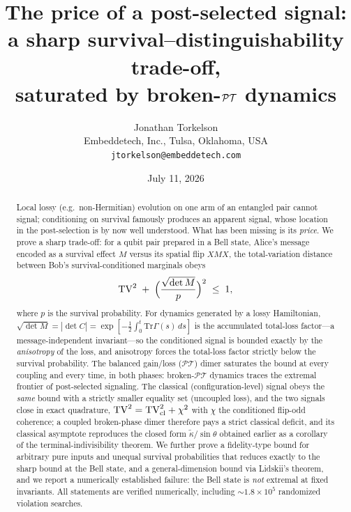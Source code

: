 \documentclass[11pt]{article}
\title{The price of a post-selected signal:\\
a sharp survival--distinguishability trade-off,\\
saturated by broken-$\PT$ dynamics}
\author{Jonathan Torkelson\\[2pt]
\small Embeddetech, Inc., Tulsa, Oklahoma, USA\\
\small\texttt{jtorkelson@embeddetech.com}}
\date{July 11, 2026}
\theoremstyle{remark}
\newcommand{\PT}{\mathcal{PT}}
\newcommand{\TV}{\mathrm{TV}}
\newcommand{\Tr}{\mathrm{Tr}}
\begin{document}
\maketitle

\begin{abstract}
Local lossy (e.g.\ non-Hermitian) evolution on one arm of an entangled
pair cannot signal; conditioning on survival famously produces an
apparent signal, whose location in the post-selection is by now well
understood. What has been missing is its \emph{price}. We prove a
sharp trade-off: for a qubit pair prepared in a Bell state, Alice's
message encoded as a survival effect $M$ versus its spatial flip
$XMX$, the total-variation distance between Bob's survival-conditioned
marginals obeys
\[
\TV^{2}\;+\;\Bigl(\frac{\sqrt{\det M}}{p}\Bigr)^{2}\;\le\;1 ,
\]
where $p$ is the survival probability. For dynamics generated by a
lossy Hamiltonian, $\sqrt{\det M}=|\det C|=\exp[-\tfrac12\!\int_0^t\!\Tr\Gamma(s)\,
ds]$ is the accumulated total-loss factor---a message-independent
invariant---so the conditioned signal is bounded exactly by the
\emph{anisotropy} of the loss, and anisotropy forces the total-loss
factor strictly below the survival probability. The
balanced gain/loss ($\PT$) dimer saturates the bound at every coupling
and every time, in both phases: broken-$\PT$ dynamics traces the
extremal frontier of post-selected signaling. The classical
(configuration-level) signal obeys the \emph{same} bound with a
strictly smaller equality set (uncoupled loss), and the two signals
close in exact quadrature,
$\TV^{2}=\TV_{\rm cl}^{2}+\chi^{2}$ with $\chi$ the conditioned
flip-odd coherence; a coupled broken-phase dimer therefore pays a
strict classical deficit, and its classical asymptote reproduces the
closed form $\tilde\kappa/\sin\theta$ obtained earlier as a corollary
of the terminal-indivisibility theorem. We further prove a
fidelity-type bound for arbitrary pure inputs and unequal survival
probabilities that reduces exactly to the sharp bound at the Bell
state, and a general-dimension bound via Lidskii's theorem, and we
report a numerically established failure: the Bell state is
\emph{not} extremal at fixed invariants. All statements are verified
numerically, including $\sim1.8\times10^{5}$ randomized violation
searches.
\end{abstract}
\end{document}
